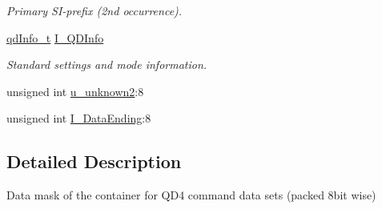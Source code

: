 \begin{DoxyCompactItemize}
\begin{DoxyCompactList}\small\item\em Primary SI-\/prefix (2nd occurrence). \item\end{DoxyCompactList}\item 
\hypertarget{structFluke_1_1Fluke189_1_1qd4__set__t_acfe06a8a79a95b251f766d2408a60fb6}{
\hyperlink{structFluke_1_1Fluke189_1_1qdInfo__t}{qdInfo\_\-t} \hyperlink{structFluke_1_1Fluke189_1_1qd4__set__t_acfe06a8a79a95b251f766d2408a60fb6}{I\_\-QDInfo}}
\label{structFluke_1_1Fluke189_1_1qd4__set__t_acfe06a8a79a95b251f766d2408a60fb6}

\begin{DoxyCompactList}\small\item\em Standard settings and mode information. \item\end{DoxyCompactList}\item 
unsigned int \hyperlink{structFluke_1_1Fluke189_1_1qd4__set__t_a7ac5798f6713dc4b811b2388d9374c74}{u\_\-unknown2}:8
\item 
unsigned int \hyperlink{structFluke_1_1Fluke189_1_1qd4__set__t_a08bcc1ec254053f32250beb7ae3e7219}{I\_\-DataEnding}:8
\end{DoxyCompactItemize}


\subsection{Detailed Description}
Data mask of the container for QD4 command data sets (packed 8bit wise) 

